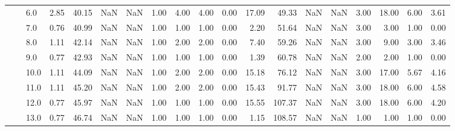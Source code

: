 \begin{tabular}{lllrrrrrrrrrrrrrrrr}
       &     & 6.0  &      2.85 &      40.15 &               NaN &                NaN &  1.00 &   4.00 &             4.00 &                         0.00 &     17.09 &      49.33 &               NaN &                NaN & 3.00 &  18.00 &             6.00 &                         3.61 \\
       &     & 7.0  &      0.76 &      40.99 &               NaN &                NaN &  1.00 &   1.00 &             1.00 &                         0.00 &      2.20 &      51.64 &               NaN &                NaN & 3.00 &   3.00 &             1.00 &                         0.00 \\
       &     & 8.0  &      1.11 &      42.14 &               NaN &                NaN &  1.00 &   2.00 &             2.00 &                         0.00 &      7.40 &      59.26 &               NaN &                NaN & 3.00 &   9.00 &             3.00 &                         3.46 \\
       &     & 9.0  &      0.77 &      42.93 &               NaN &                NaN &  1.00 &   1.00 &             1.00 &                         0.00 &      1.39 &      60.78 &               NaN &                NaN & 2.00 &   2.00 &             1.00 &                         0.00 \\
       &     & 10.0 &      1.11 &      44.09 &               NaN &                NaN &  1.00 &   2.00 &             2.00 &                         0.00 &     15.18 &      76.12 &               NaN &                NaN & 3.00 &  17.00 &             5.67 &                         4.16 \\
       &     & 11.0 &      1.11 &      45.20 &               NaN &                NaN &  1.00 &   2.00 &             2.00 &                         0.00 &     15.43 &      91.77 &               NaN &                NaN & 3.00 &  18.00 &             6.00 &                         4.58 \\
       &     & 12.0 &      0.77 &      45.97 &               NaN &                NaN &  1.00 &   1.00 &             1.00 &                         0.00 &     15.55 &     107.37 &               NaN &                NaN & 3.00 &  18.00 &             6.00 &                         4.20 \\
       &     & 13.0 &      0.77 &      46.74 &               NaN &                NaN &  1.00 &   1.00 &             1.00 &                         0.00 &      1.15 &     108.57 &               NaN &                NaN & 1.00 &   1.00 &             1.00 &                         0.00 \\

\end{tabular}
